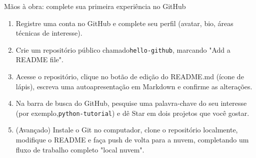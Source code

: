 \begin{tcbpractice}{Mãos à obra: complete sua primeira experiência no GitHub}
\begin{enumerate}
  \item Registre uma conta no GitHub e complete seu perfil (avatar, bio, áreas técnicas de interesse).
  \item Crie um repositório público chamado\texttt{hello-\allowbreak github}, marcando "Add a README file".
  \item Acesse o repositório, clique no botão de edição do README.md (ícone de lápis), escreva uma autoapresentação em Markdown e confirme as alterações.
  \item Na barra de busca do GitHub, pesquise uma palavra-chave do seu interesse (por exemplo,\texttt{python-\allowbreak tutorial}) e dê Star em dois projetos que você gostar.
  \item (Avançado) Instale o Git no computador, clone o repositório localmente, modifique o README e faça push de volta para a nuvem, completando um fluxo de trabalho completo "local nuvem".
\end{enumerate}

\end{tcbpractice}
